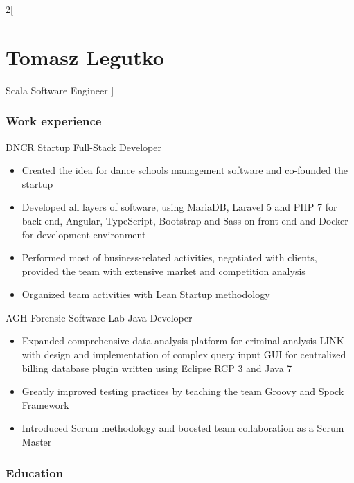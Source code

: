 \documentclass{tccv}
\begin{document}
\begin{multicols}{2}[
\part{Tomasz Legutko}{Scala Software Engineer}
]

\section{Work experience}
\begin{eventlist}

     {DNCR Startup}
     {Full-Stack Developer}
     \begin{itemize}[noitemsep,topsep=0pt]
     \item Created the idea for dance schools management software and co-founded the startup
     \item Developed all layers of software, using MariaDB, Laravel 5 and PHP 7 for back-end, Angular, TypeScript, Bootstrap and Sass on front-end and Docker for development environment
     \item Performed most of business-related activities, negotiated with clients, provided the team with extensive market and competition analysis
     \item Organized team activities with Lean Startup methodology
     \end{itemize}

     {AGH Forensic Software Lab}
     {Java Developer}
     \begin{itemize}[noitemsep,topsep=0pt]
     \item Expanded comprehensive data analysis platform for criminal analysis LINK with design and implementation of complex query input GUI for centralized billing database plugin written using Eclipse RCP 3 and Java 7
     \item Greatly improved testing practices by teaching the team Groovy and Spock Framework
     \item Introduced Scrum methodology and boosted team collaboration as a Scrum Master
     \end{itemize}
     
\end{eventlist}

\bigskip
\section{Education}
\begin{eventlist}


\end{eventlist}
\end{multicols}
\end{document}
